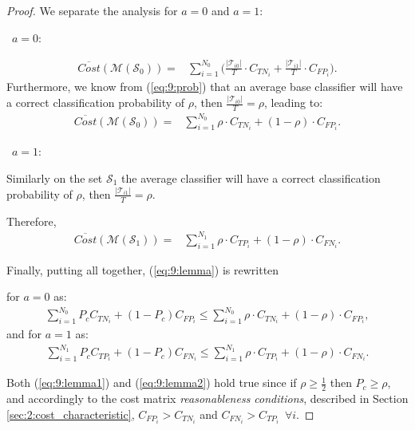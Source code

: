 {\begin{proof}
  \noindent We separate the analysis for $a=0$ and $a=1$:
  
  \textbullet\ $a=0:$
  
  \begin{align}
    \overline{Cost} (\mathcal{M}(\mathcal{S}_0)) =& \sum_{i=1}^{N_0} \bigg( 
    \frac{\vert \mathcal{T}_{i0} \vert}{T} \cdot C_{TN_i}
    + \frac{\vert \mathcal{T}_{i1} \vert}{T} \cdot C_{FP_i}\bigg).
  \end{align}
  Furthermore, we know from (\ref{eq:9:prob}) that an average base classifier will have a correct 
  classification probability of $\rho$, then $\frac{\vert \mathcal{T}_{i0} \vert}{T}=\rho$, leading 
  to:
  \begin{align}
    \overline{Cost} (\mathcal{M}(\mathcal{S}_0)) =& \sum_{i=1}^{N_0}  
    \rho \cdot C_{TN_i} + (1-\rho) \cdot C_{FP_i} .
  \end{align}

  \textbullet\ $a=1:$
 
 \noindent Similarly on the set $\mathcal{S}_1$ the average classifier will have a correct 
  classification probability of $\rho$, then $\frac{\vert \mathcal{T}_{i1} \vert}{T}=\rho$. 
  
  \noindent Therefore,
  \begin{align}
    \overline{Cost} (\mathcal{M}(\mathcal{S}_1)) =& \sum_{i=1}^{N_1}  
    \rho \cdot C_{TP_i} + (1-\rho) \cdot C_{FN_i} .
  \end{align}
 
  \noindent Finally, putting all together, (\ref{eq:9:lemma}) is rewritten
  
  \noindent for $a=0$ as:
  \begin{align}\label{eq:9:lemma1}
    \sum_{i=1}^{N_0} P_c C_{TN_i} +(1-P_c)C_{FP_i} \le 
    \sum_{i=1}^{N_0} \rho \cdot C_{TN_i} + (1-\rho) \cdot C_{FP_i},
  \end{align}
  and for $a=1$ as:
  \begin{align}\label{eq:9:lemma2}
    \sum_{i=1}^{N_1} P_c C_{TP_i} + (1-P_c)C_{FN_i} \le 
    \sum_{i=1}^{N_1}  \rho \cdot C_{TP_i} + (1-\rho) \cdot C_{FN_i}.
  \end{align}
 
  \noindent Both (\ref{eq:9:lemma1}) and (\ref{eq:9:lemma2}) hold true since if $\rho \ge 
  \frac{1}{2}$  then $P_c\ge\rho$, and accordingly to the cost matrix \textit{reasonableness 
  conditions},  described in Section \ref{sec:2:cost_characteristic}, $C_{FP_i} > C_{TN_i}$ and 
  $C_{FN_i} >   C_{TP_i}$~$\forall i$.
  \end{proof}
  
}

